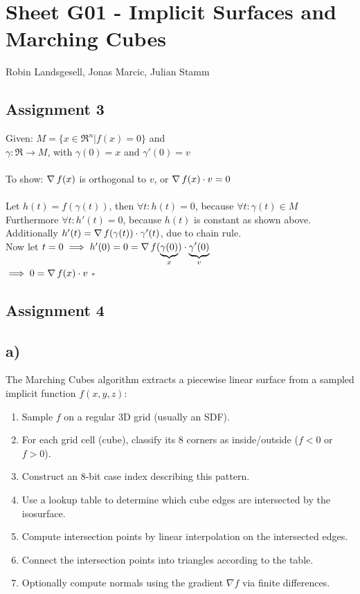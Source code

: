 \documentclass{article}
\begin{document}
\section{Sheet G01 - Implicit Surfaces and Marching Cubes}
Robin Landsgesell, Jonas Marcic, Julian Stamm

\subsection*{Assignment 3}

Given: $M = \{x \in \Re^n | f(x)=0\}$ and\\
$\gamma : \Re \rightarrow M$, with $\gamma(0) = x$ and $\gamma'(0) = v$\\
\\
To show: $\operatorname{\nabla} f(x)$ is orthogonal to $v$, or $\operatorname{\nabla} f(x)\cdot v = 0$\\
\\
Let $h(t) = f(\gamma(t))$, then $\forall t: h(t) = 0$, because $\forall t: \gamma(t) \in M$\\
Furthermore $\forall t: h'(t) = 0$, because $h(t)$ is constant as shown above.\\
Additionally $h'(t) = \operatorname{\nabla} f(\gamma(t)) \cdot \gamma'(t)$, due to chain rule.\\
Now let $t=0 \implies h'(0) = 0 = \operatorname{\nabla} f(\underbrace{\gamma(0)}_{x}) \cdot \underbrace{\gamma'(0)}_{v}$\\
$\implies 0 = \operatorname{\nabla} f(x)\cdot v$ $\square$

\subsection*{Assignment 4}

\subsection*{a)}
The Marching Cubes algorithm extracts a piecewise linear surface from a sampled implicit function $f(x,y,z)$:

\begin{enumerate}
	\item Sample $f$ on a regular 3D grid (usually an SDF).  
	\item For each grid cell (cube), classify its 8 corners as inside/outside ($f<0$ or $f>0$).  
	\item Construct an 8-bit case index describing this pattern.  
	\item Use a lookup table to determine which cube edges are intersected by the isosurface.  
	\item Compute intersection points by linear interpolation on the intersected edges.  
	\item Connect the intersection points into triangles according to the table.  
	\item Optionally compute normals using the gradient $\nabla f$ via finite differences.  
\end{enumerate}
\end{document}
